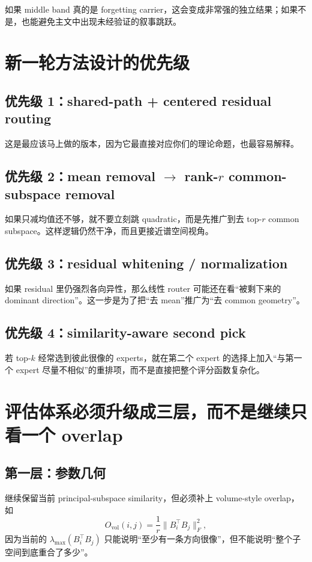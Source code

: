 \documentclass[11pt]{article}
\begin{document}
如果 middle band 真的是 forgetting carrier，这会变成非常强的独立结果；如果不是，也能避免主文中出现未经验证的叙事跳跃。

\section{新一轮方法设计的优先级}

\subsection{优先级 1：shared-path + centered residual routing}
这是最应该马上做的版本，因为它最直接对应你们的理论命题，也最容易解释。

\subsection{优先级 2：mean removal $\rightarrow$ rank-$r$ common-subspace removal}
如果只减均值还不够，就不要立刻跳 quadratic，而是先推广到去 top-$r$ common subspace。这样逻辑仍然干净，而且更接近谱空间视角。

\subsection{优先级 3：residual whitening / normalization}
如果 residual 里仍强烈各向异性，那么线性 router 可能还在看“被剩下来的 dominant direction”。这一步是为了把“去 mean”推广为“去 common geometry”。

\subsection{优先级 4：similarity-aware second pick}
若 top-$k$ 经常选到彼此很像的 experts，就在第二个 expert 的选择上加入“与第一个 expert 尽量不相似”的重排项，而不是直接把整个评分函数复杂化。

\section{评估体系必须升级成三层，而不是继续只看一个 overlap}

\subsection{第一层：参数几何}
继续保留当前 principal-subspace similarity，但必须补上 volume-style overlap，如
\[
    O_{\mathrm{vol}}(i,j)=\frac{1}{r}\lVert B_i^\top B_j\rVert_F^2,
\]
因为当前的 $\lambda_{\max}(B_i^\top B_j)$ 只能说明“至少有一条方向很像”，但不能说明“整个子空间到底重合了多少”。
\end{document}
